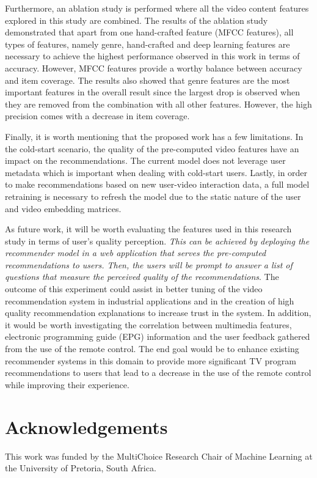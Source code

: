 \documentclass[review]{elsarticle}
\begin{document}
Furthermore, an ablation study is performed where all the video content features explored in this study are combined. The results of the ablation study demonstrated that apart from one hand-crafted feature (MFCC features), all types of features, namely genre, hand-crafted and deep learning features are necessary to achieve the highest performance observed in this work in terms of accuracy. However, MFCC features provide a worthy balance between accuracy and item coverage. The results also showed that genre features are the most important features in the overall result since the largest drop is observed when they are removed from the combination with all other features. However, the high precision comes with a decrease in item coverage. 

Finally, it is worth mentioning that the proposed work has a few limitations. In the cold-start scenario, the quality of the pre-computed video features have an impact on the recommendations. The current model does not leverage user metadata which is important when dealing with cold-start users. Lastly, in order to make recommendations based on new user-video interaction data, a full model retraining is necessary to refresh the model due to the static nature of the user and video embedding matrices.   




As future work, it will be worth evaluating the features used in this research study in terms of user's quality perception. \textit{This can be achieved by deploying the recommender model in a web application that serves the pre-computed recommendations to users. Then, the users will be prompt to answer a list of questions that measure the perceived quality of the recommendations}. The outcome of this experiment could assist in better tuning of the video recommendation system in industrial applications and in the creation of high quality recommendation explanations to increase trust in the system. In addition, it would be worth investigating the correlation between multimedia features, electronic programming guide (EPG) information and the user feedback gathered from the use of the remote control. The end goal would be to enhance existing recommender systems in this domain to provide more significant TV program recommendations to users that lead to a decrease in the use of the remote control while improving their experience. 


\section*{Acknowledgements}

This work was funded by the MultiChoice Research Chair of Machine Learning at the University of Pretoria, South Africa.



\end{document}

